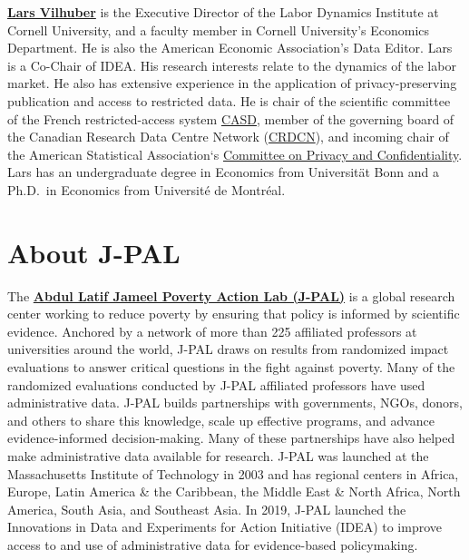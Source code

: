 \textbf{\href{https://lars.vilhuber.com/}{Lars Vilhuber}} is the Executive Director of the Labor Dynamics Institute at Cornell University, and a faculty member in Cornell University's Economics Department. He is also the American Economic Association's Data Editor. Lars is a Co-Chair of IDEA. His research interests relate to the dynamics of the labor market. He also has extensive experience in the application of privacy-preserving publication and access to restricted data. He is chair of the scientific committee of the French restricted-access system \href{https://casd.eu}{CASD}, member of the governing board of the Canadian Research Data Centre Network (\href{https://crdcn.org}{CRDCN}), and incoming chair of the American Statistical Association`s \href{https://community.amstat.org/cpc/home}{Committee on Privacy and Confidentiality}. Lars has an undergraduate degree in Economics from Universität Bonn and a Ph.D.~in Economics from Université de Montréal.

\newpage
\hypertarget{about2}{%
\section*{About J-PAL}\label{about2}}
The \textbf{\href{https://www.povertyactionlab.org/}{Abdul Latif Jameel Poverty Action Lab (J-PAL)}} is a global research center working to reduce poverty by ensuring that policy is informed by scientific evidence. Anchored by a network of more than 225 affiliated professors at universities around the world, J-PAL draws on results from randomized impact evaluations to answer critical questions in the fight against poverty. Many of the randomized evaluations conducted by J-PAL affiliated professors have used administrative data. J-PAL builds partnerships with governments, NGOs, donors, and others to share this knowledge, scale up effective programs, and advance evidence-informed decision-making. Many of these partnerships have also helped make administrative data available for research. J-PAL was launched at the Massachusetts Institute of Technology in 2003 and has regional centers in Africa, Europe, Latin America \& the Caribbean, the Middle East \& North Africa, North America, South Asia, and Southeast Asia. In 2019, J-PAL launched the Innovations in Data and Experiments for Action Initiative (IDEA) to improve access to and use of administrative data for evidence-based policymaking.

